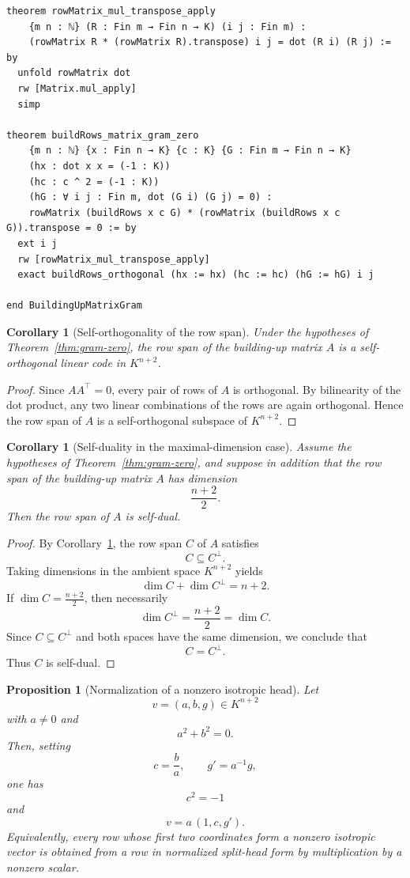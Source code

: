 \documentclass[12pt]{article}
\newtheorem{prop}[theorem]{Proposition}
\newtheorem{cor}[theorem]{Corollary}
\begin{document}
\begin{lstlisting}[caption={Lean verification for Theorem~\ref{thm:gram-zero}.}]
theorem rowMatrix_mul_transpose_apply
    {m n : ℕ} (R : Fin m → Fin n → K) (i j : Fin m) :
    (rowMatrix R * (rowMatrix R).transpose) i j = dot (R i) (R j) := by
  unfold rowMatrix dot
  rw [Matrix.mul_apply]
  simp

theorem buildRows_matrix_gram_zero
    {m n : ℕ} {x : Fin n → K} {c : K} {G : Fin m → Fin n → K}
    (hx : dot x x = (-1 : K))
    (hc : c ^ 2 = (-1 : K))
    (hG : ∀ i j : Fin m, dot (G i) (G j) = 0) :
    rowMatrix (buildRows x c G) * (rowMatrix (buildRows x c G)).transpose = 0 := by
  ext i j
  rw [rowMatrix_mul_transpose_apply]
  exact buildRows_orthogonal (hx := hx) (hc := hc) (hG := hG) i j

end BuildingUpMatrixGram
\end{lstlisting}

\begin{cor}[Self-orthogonality of the row span]
\label{cor:self-orthogonal-row-span}
Under the hypotheses of Theorem~\ref{thm:gram-zero}, the row span of the building-up matrix $A$ is a self-orthogonal linear code in $K^{n+2}$.
\end{cor}

\begin{proof}
Since $AA^\top=0$, every pair of rows of $A$ is orthogonal. By bilinearity of the dot product, any two linear combinations of the rows are again orthogonal. Hence the row span of $A$ is a self-orthogonal subspace of $K^{n+2}$.
\end{proof}

\begin{cor}[Self-duality in the maximal-dimension case]
\label{cor:self-dual-maximal}
Assume the hypotheses of Theorem~\ref{thm:gram-zero}, and suppose in addition that the row span of the building-up matrix $A$ has dimension
\[
\frac{n+2}{2}.
\]
Then the row span of $A$ is self-dual.
\end{cor}

\begin{proof}
By Corollary~\ref{cor:self-orthogonal-row-span}, the row span $C$ of $A$ satisfies
\[
C \subseteq C^\perp.
\]
Taking dimensions in the ambient space $K^{n+2}$ yields
\[
\dim C + \dim C^\perp = n+2.
\]
If $\dim C = \frac{n+2}{2}$, then necessarily
\[
\dim C^\perp = \frac{n+2}{2} = \dim C.
\]
Since $C\subseteq C^\perp$ and both spaces have the same dimension, we conclude that
\[
C=C^\perp.
\]
Thus $C$ is self-dual. 
\end{proof}

\begin{prop}[Normalization of a nonzero isotropic head]
\label{prop:head-normalization}
Let
\[
v=(a,b,g)\in K^{n+2}
\]
with $a\neq 0$ and
\[
a^2+b^2=0.
\]
Then, setting
\[
c=\frac{b}{a},
\qquad
g' = a^{-1} g,
\]
one has
\[
c^2=-1
\]
and
\[
v = a\,(1,c,g').
\]
Equivalently, every row whose first two coordinates form a nonzero isotropic vector is obtained from a row in normalized split-head form by multiplication by a nonzero scalar.
\end{prop}
\end{document}
